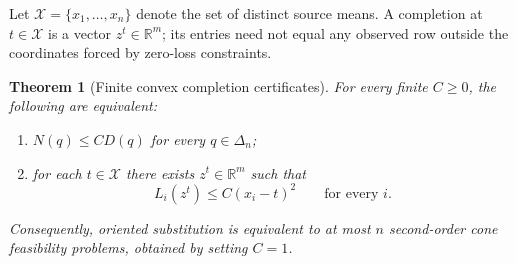 \documentclass[11pt,a4paper]{article}
\newtheorem{theorem}{Theorem}
\begin{document}
Let $\mathcal X=\{x_1,\ldots,x_n\}$ denote the set of distinct source
means. A completion at $t\in\mathcal X$ is a vector $z^t\in\mathbb R^m$;
its entries need not equal any observed row outside the coordinates
forced by zero-loss constraints.

\begin{theorem}[Finite convex completion certificates]
\label{thm:completion}
For every finite $C\geq0$, the following are equivalent:
\begin{enumerate}
\item $N(q)\leq C D(q)$ for every $q\in\Delta_n$;
\item for each $t\in\mathcal X$ there exists $z^t\in\mathbb R^m$ such that
\begin{equation}\label{eq:completion-constraints}
 L_i(z^t)\leq C(x_i-t)^2\qquad\text{for every }i.
\end{equation}
\end{enumerate}
Consequently, oriented substitution is equivalent to at most $n$
second-order cone feasibility problems, obtained by setting $C=1$.
\end{theorem}
\end{document}
